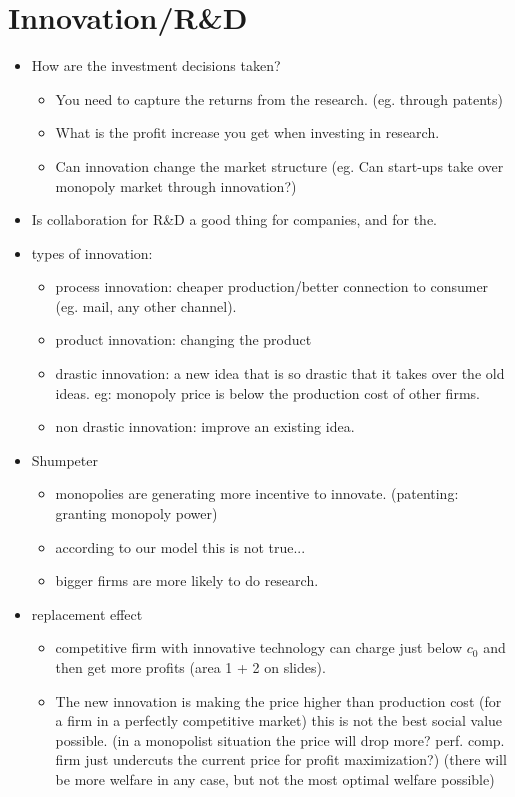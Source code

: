 \documentclass[12pt, a4paper, titlepage]{extarticle}
\begin{document}
\section{Innovation/R\&D}
\begin{itemize}
    \item How are the investment decisions taken?
    \begin{itemize}
        \item You need to capture the returns from the research. (eg. through patents)
        \item What is the profit increase you get when investing in research.
        \item Can innovation change the market structure (eg. Can start-ups take over monopoly market through innovation?)
    \end{itemize}
    \item Is collaboration for R\&D a good thing for companies, and for the.
    \item types of innovation:
    \begin{itemize}
        \item process innovation: cheaper production/better connection to consumer (eg. mail, any other channel).
        \item product innovation: changing the product
        \item drastic innovation: a new idea that is so drastic that it takes over the old ideas. eg: monopoly price is below the production cost of other firms.
        \item non drastic innovation: improve an existing idea.
    \end{itemize}
    \item Shumpeter
    \begin{itemize}
        \item monopolies are generating more incentive to innovate. (patenting: granting monopoly power)
        \item according to our model this is not true...
        \item bigger firms are more likely to do research.
    \end{itemize}
    \item replacement effect
    \begin{itemize}
        \item competitive firm with innovative technology can charge just below $c_0$ and then get more profits (area 1 + 2 on slides).
        \item The new innovation is making the price higher than production cost (for a firm in a perfectly competitive market) this is not the best social value possible. (in a monopolist situation the price will drop more? perf. comp. firm just undercuts the current price for profit maximization?) (there will be more welfare in any case, but not the most optimal welfare possible)

\end{itemize}
\end{itemize}
\end{document}
